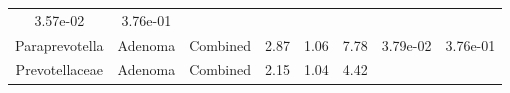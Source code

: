 \documentclass[12pt,]{article}
\begin{document}
\begin{longtable}[]{@{}cccccccc@{}}
\begin{minipage}[t]{0.06\columnwidth}
3.57e-02\strut
\end{minipage} & \begin{minipage}[t]{0.06\columnwidth}\centering\strut
3.76e-01\strut
\end{minipage}\tabularnewline
\begin{minipage}[t]{0.19\columnwidth}\centering\strut
Paraprevotella\strut
\end{minipage} & \begin{minipage}[t]{0.07\columnwidth}\centering\strut
Adenoma\strut
\end{minipage} & \begin{minipage}[t]{0.09\columnwidth}\centering\strut
Combined\strut
\end{minipage} & \begin{minipage}[t]{0.03\columnwidth}\centering\strut
2.87\strut
\end{minipage} & \begin{minipage}[t]{0.14\columnwidth}\centering\strut
1.06\strut
\end{minipage} & \begin{minipage}[t]{0.14\columnwidth}\centering\strut
7.78\strut
\end{minipage} & \begin{minipage}[t]{0.06\columnwidth}\centering\strut
3.79e-02\strut
\end{minipage} & \begin{minipage}[t]{0.06\columnwidth}\centering\strut
3.76e-01\strut
\end{minipage}\tabularnewline
\begin{minipage}[t]{0.19\columnwidth}\centering\strut
Prevotellaceae\strut
\end{minipage} & \begin{minipage}[t]{0.07\columnwidth}\centering\strut
Adenoma\strut
\end{minipage} & \begin{minipage}[t]{0.09\columnwidth}\centering\strut
Combined\strut
\end{minipage} & \begin{minipage}[t]{0.03\columnwidth}\centering\strut
2.15\strut
\end{minipage} & \begin{minipage}[t]{0.14\columnwidth}\centering\strut
1.04\strut
\end{minipage} & \begin{minipage}[t]{0.14\columnwidth}\centering\strut
4.42\strut
\end{minipage} & \begin{minipage}[t]{0.06\columnwidth}\centering\strut

\end{minipage}
\end{longtable}
\end{document}
